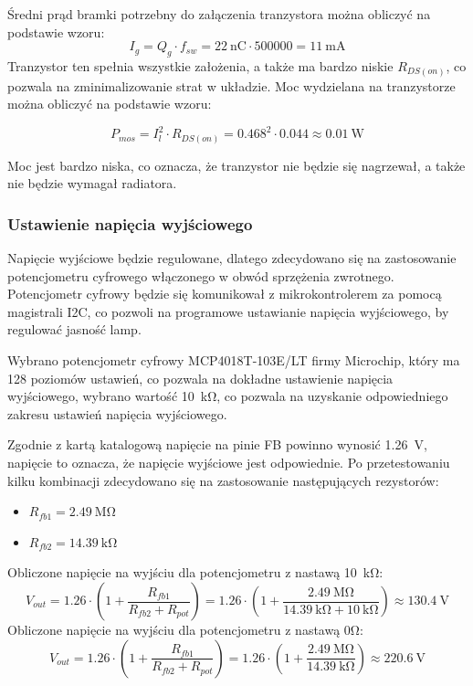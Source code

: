 \documentclass[../../main.tex]{subfiles}
\begin{document}
Średni prąd bramki potrzebny do załączenia tranzystora można obliczyć na podstawie wzoru:
\begin{equation}
    I_{g} = Q_{g} \cdot f_{sw} = \SI{22}{\nano\coulomb} \cdot 500000 = \SI{11}{\milli\ampere}
\end{equation}
Tranzystor ten spełnia wszystkie założenia, a także ma bardzo niskie $R_{DS(on)}$, co pozwala na zminimalizowanie strat w układzie.
Moc wydzielana na tranzystorze można obliczyć na podstawie wzoru:

\begin{equation}
    P_{mos} = I_{l}^2 \cdot R_{DS(on)} = 0.468^2 \cdot 0.044 \approx \SI{0.01}{\watt}
\end{equation}

Moc jest bardzo niska, co oznacza, że tranzystor nie będzie się nagrzewał, a także nie będzie wymagał radiatora.

\subsubsection{Ustawienie napięcia wyjściowego}
Napięcie wyjściowe będzie regulowane, dlatego zdecydowano się na zastosowanie potencjometru cyfrowego włączonego w obwód sprzężenia zwrotnego.
Potencjometr cyfrowy będzie się komunikował z mikrokontrolerem za pomocą magistrali I2C, co pozwoli na programowe ustawianie napięcia wyjściowego,
by regulować jasność lamp.

Wybrano potencjometr cyfrowy MCP4018T-103E/LT firmy Microchip,
który ma 128 poziomów ustawień, co pozwala na dokładne ustawienie napięcia wyjściowego,
wybrano wartość \SI{10}{\kilo\ohm}, co pozwala na uzyskanie odpowiedniego zakresu ustawień napięcia wyjściowego.

Zgodnie z kartą katalogową napięcie na pinie FB powinno wynosić \SI{1.26}{\volt}, napięcie to oznacza, że napięcie wyjściowe jest odpowiednie. 
Po przetestowaniu kilku kombinacji zdecydowano się na zastosowanie następujących rezystorów:
\begin{itemize}
    \item $R_{fb1} = \SI{2.49}{\mega\ohm}$
    \item $R_{fb2} = \SI{14.39}{\kilo\ohm}$
\end{itemize}

Obliczone napięcie na wyjściu dla potencjometru z nastawą \SI{10}{\kilo\ohm}:
\begin{equation}
    V_{out} = 1.26 \cdot (1 + \frac{R_{fb1}}{R_{fb2} + R_{pot}}) = 1.26 \cdot (1 + \frac{\SI{2.49}{\mega\ohm}}{\SI{14.39}{\kilo\ohm} + \SI{10}{\kilo\ohm}}) \approx \SI{130.4}{\volt}
\end{equation}
Obliczone napięcie na wyjściu dla potencjometru z nastawą 0\si{\ohm}:
\begin{equation}
    V_{out} = 1.26 \cdot (1 + \frac{R_{fb1}}{R_{fb2} + R_{pot}}) = 1.26 \cdot (1 + \frac{\SI{2.49}{\mega\ohm}}{\SI{14.39}{\kilo\ohm}}) \approx \SI{220.6}{\volt}
\end{equation}
\end{document}
